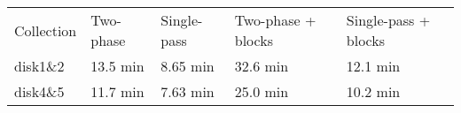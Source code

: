 \begin{longtable}[]{@{}lllll@{}}
\toprule
\begin{minipage}[t]{0.17\columnwidth}\raggedright\strut
Collection
\strut\end{minipage} &
\begin{minipage}[t]{0.17\columnwidth}\raggedright\strut
Two-phase
\strut\end{minipage} &
\begin{minipage}[t]{0.17\columnwidth}\raggedright\strut
Single-pass
\strut\end{minipage} &
\begin{minipage}[t]{0.17\columnwidth}\raggedright\strut
Two-phase + blocks
\strut\end{minipage} &
\begin{minipage}[t]{0.17\columnwidth}\raggedright\strut
Single-pass + blocks
\strut\end{minipage}\tabularnewline
\begin{minipage}[t]{0.17\columnwidth}\raggedright\strut
disk1\&2
\strut\end{minipage} &
\begin{minipage}[t]{0.17\columnwidth}\raggedright\strut
13.5 min
\strut\end{minipage} &
\begin{minipage}[t]{0.17\columnwidth}\raggedright\strut
8.65 min
\strut\end{minipage} &
\begin{minipage}[t]{0.17\columnwidth}\raggedright\strut
32.6 min
\strut\end{minipage} &
\begin{minipage}[t]{0.17\columnwidth}\raggedright\strut
12.1 min
\strut\end{minipage}\tabularnewline
\begin{minipage}[t]{0.17\columnwidth}\raggedright\strut
disk4\&5
\strut\end{minipage} &
\begin{minipage}[t]{0.17\columnwidth}\raggedright\strut
11.7 min
\strut\end{minipage} &
\begin{minipage}[t]{0.17\columnwidth}\raggedright\strut
7.63 min
\strut\end{minipage} &
\begin{minipage}[t]{0.17\columnwidth}\raggedright\strut
25.0 min
\strut\end{minipage} &
\begin{minipage}[t]{0.17\columnwidth}\raggedright\strut
10.2 min
\strut\end{minipage}\tabularnewline

\end{longtable}
